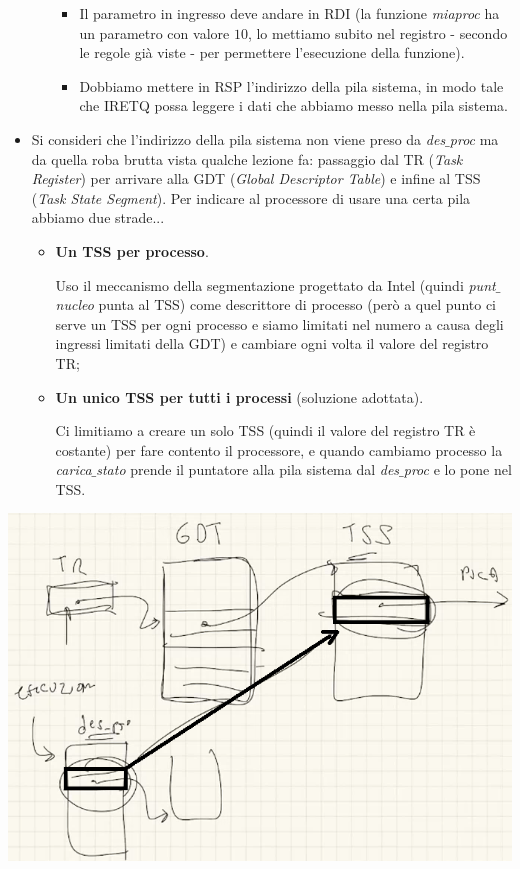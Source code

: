 \begin{itemize}
\begin{itemize}
\begin{itemize}
			\item Il parametro in ingresso deve andare in RDI (la funzione \emph{miaproc} ha un parametro con valore $10$, lo mettiamo subito nel registro - secondo le regole già viste - per permettere l'esecuzione della funzione).
			\item Dobbiamo mettere in RSP l'indirizzo della pila sistema, in modo tale che IRETQ possa leggere i dati che abbiamo messo nella pila sistema.
		\end{itemize}
	\end{itemize}
	\item Si consideri che l'indirizzo della pila sistema non viene preso da \emph{des$\_$proc} ma da quella roba brutta vista qualche lezione fa: passaggio dal TR (\emph{Task Register}) per arrivare alla GDT (\emph{Global Descriptor Table}) e infine al TSS (\emph{Task State Segment}). Per indicare al processore di usare una certa pila abbiamo due strade...
	\begin{itemize}
		\item \textbf{Un TSS per processo}.
		
		Uso il meccanismo della segmentazione progettato da Intel (quindi \emph{punt$\_$nucleo} punta al TSS) come descrittore di processo (però a quel punto ci serve un TSS per ogni processo e siamo limitati nel numero a causa degli ingressi limitati della GDT) e cambiare ogni volta il valore del registro TR;
		\item \textbf{Un unico TSS per tutti i processi} (soluzione adottata).
		
		Ci limitiamo a creare un solo TSS (quindi il valore del registro TR è costante) per fare contento il processore, e quando cambiamo processo la \emph{carica$\_$stato} prende il puntatore alla pila sistema dal \emph{des$\_$proc} e lo pone nel TSS.
	\end{itemize}
\end{itemize}

\begin{center}\includegraphics[scale=.65]{img/170.PNG}\end{center}